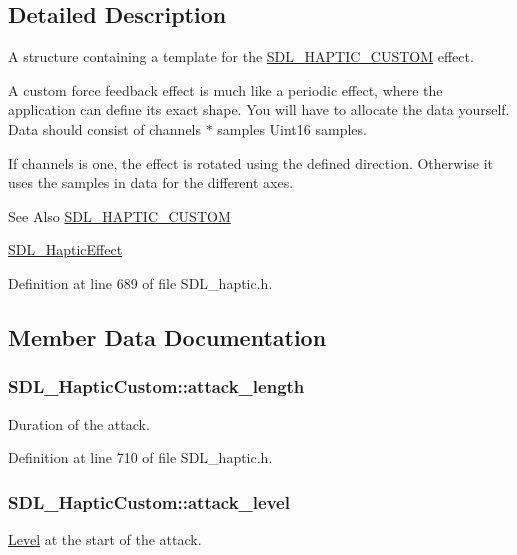 \subsection{Detailed Description}
A structure containing a template for the \hyperlink{_s_d_l__haptic_8h_a8a18c4de1076ac9bebd718329d16db29}{S\-D\-L\-\_\-\-H\-A\-P\-T\-I\-C\-\_\-\-C\-U\-S\-T\-O\-M} effect. 

A custom force feedback effect is much like a periodic effect, where the application can define its exact shape. You will have to allocate the data yourself. Data should consist of channels $\ast$ samples Uint16 samples.

If channels is one, the effect is rotated using the defined direction. Otherwise it uses the samples in data for the different axes.

\begin{DoxySeeAlso}{See Also}
\hyperlink{_s_d_l__haptic_8h_a8a18c4de1076ac9bebd718329d16db29}{S\-D\-L\-\_\-\-H\-A\-P\-T\-I\-C\-\_\-\-C\-U\-S\-T\-O\-M} 

\hyperlink{union_s_d_l___haptic_effect}{S\-D\-L\-\_\-\-Haptic\-Effect} 
\end{DoxySeeAlso}


Definition at line 689 of file S\-D\-L\-\_\-haptic.\-h.



\subsection{Member Data Documentation}
\hypertarget{struct_s_d_l___haptic_custom_a018b35d89398c26e10d1fb4315d1dda1}{
\subsubsection[{attack\-\_\-length}]{ S\-D\-L\-\_\-\-Haptic\-Custom\-::attack\-\_\-length}}\label{struct_s_d_l___haptic_custom_a018b35d89398c26e10d1fb4315d1dda1}
Duration of the attack. 

Definition at line 710 of file S\-D\-L\-\_\-haptic.\-h.

\hypertarget{struct_s_d_l___haptic_custom_ad6e394e3775372af3eb9e02823987405}{
\subsubsection[{attack\-\_\-level}]{ S\-D\-L\-\_\-\-Haptic\-Custom\-::attack\-\_\-level}}\label{struct_s_d_l___haptic_custom_ad6e394e3775372af3eb9e02823987405}
\hyperlink{class_level}{Level} at the start of the attack. 

